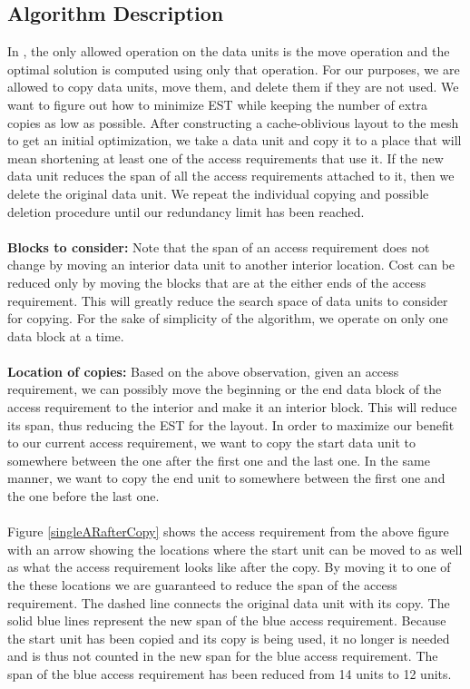 \documentclass[conference]{acmsiggraph}
\begin{document}
\subsection{Algorithm Description}

In \cite{cacheobliviouslayout}, the only allowed operation on the data units is the move operation and the optimal solution is computed using only that operation. For our purposes, we are allowed to copy data units, move them, and delete them if they are not used. We want to figure out how to minimize EST while keeping the number of extra copies as low as possible. After constructing a cache-oblivious layout to the mesh to get an initial optimization, we take a data unit and copy it to a place that will mean shortening at least one of the access requirements that use it. If the new data unit reduces the span of all the access requirements attached to it, then we delete the original data unit. We repeat the individual copying and possible deletion procedure until our redundancy limit has been reached. \\
\\
{\bf Blocks to consider:} Note that the span of an access requirement does not change by moving an interior data unit to another interior location. Cost can be reduced only by moving the blocks that are at the either ends of the access requirement. This will greatly reduce the search space of data units to consider for copying. For the sake of simplicity of the algorithm, we operate on only one data block at a time. \\
\\
{\bf Location of copies:} Based on the above observation, given an access requirement, we can possibly move the beginning or the end data block of the access requirement to the interior and make it an interior block. This will reduce its span, thus reducing the EST for the layout. In order to maximize our benefit to our current access requirement, we want to copy the start data unit to somewhere between the one after the first one and the last one. In the same manner, we want to copy the end unit to somewhere between the first one and the one before the last one. \\
\\
Figure \ref{singleARafterCopy} shows the access requirement from the above figure with an arrow showing the locations where the start unit can be moved to as well as what the access requirement looks like after the copy. By moving it to one of the these locations we are guaranteed to reduce the span of the access requirement. The dashed line connects the original data unit with its copy. The solid blue lines represent the new span of the blue access requirement. Because the start unit has been copied and its copy is being used, it no longer is needed and is thus not counted in the new span for the blue access requirement. The span of the blue access requirement has been reduced from 14 units to 12 units.\\
\end{document}
